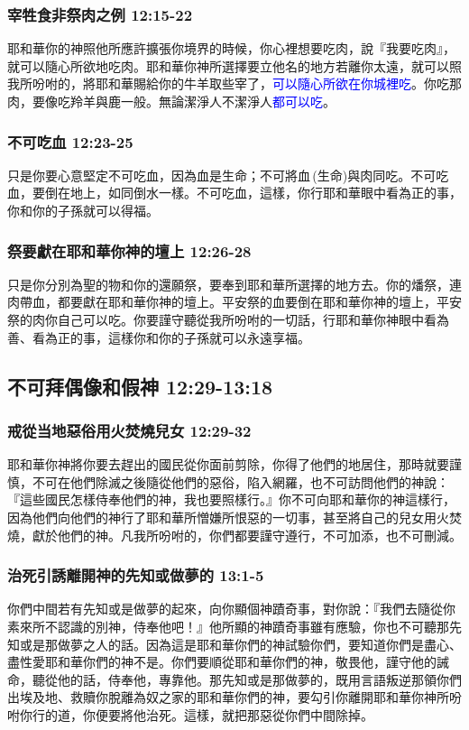 \subsubsection{宰牲食非祭肉之例 12:15-22}
耶和華你的神照他所應許擴張你境界的時候，你心裡想要吃肉，說『我要吃肉』，就可以隨心所欲地吃肉。耶和華你神所選擇要立他名的地方若離你太遠，就可以照我所吩咐的，將耶和華賜給你的牛羊取些宰了，\textcolor{blue}{可以隨心所欲在你城裡吃}。你吃那肉，要像吃羚羊與鹿一般。無論潔淨人不潔淨人\textcolor{blue}{都可以吃}。

\subsubsection{不可吃血 12:23-25}
只是你要心意堅定不可吃血，因為血是生命；不可將血 (生命)與肉同吃。不可吃血，要倒在地上，如同倒水一樣。不可吃血，這樣，你行耶和華眼中看為正的事，你和你的子孫就可以得福。

\subsubsection{祭要獻在耶和華你神的壇上 12:26-28}
只是你分別為聖的物和你的還願祭，要奉到耶和華所選擇的地方去。你的燔祭，連肉帶血，都要獻在耶和華你神的壇上。平安祭的血要倒在耶和華你神的壇上，平安祭的肉你自己可以吃。你要謹守聽從我所吩咐的一切話，行耶和華你神眼中看為善、看為正的事，這樣你和你的子孫就可以永遠享福。

\subsection{不可拜偶像和假神 12:29-13:18 }
\subsubsection{戒從当地惡俗用火焚燒兒女 12:29-32}
耶和華你神將你要去趕出的國民從你面前剪除，你得了他們的地居住，那時就要謹慎，不可在他們除滅之後隨從他們的惡俗，陷入網羅，也不可訪問他們的神說：『這些國民怎樣侍奉他們的神，我也要照樣行。』你不可向耶和華你的神這樣行，因為他們向他們的神行了耶和華所憎嫌所恨惡的一切事，甚至將自己的兒女用火焚燒，獻於他們的神。凡我所吩咐的，你們都要謹守遵行，不可加添，也不可刪減。

\subsubsection{治死引誘離開神的先知或做夢的 13:1-5}
你們中間若有先知或是做夢的起來，向你顯個神蹟奇事，對你說：『我們去隨從你素來所不認識的別神，侍奉他吧！』他所顯的神蹟奇事雖有應驗，你也不可聽那先知或是那做夢之人的話。因為這是耶和華你們的神試驗你們，要知道你們是盡心、盡性愛耶和華你們的神不是。你們要順從耶和華你們的神，敬畏他，謹守他的誡命，聽從他的話，侍奉他，專靠他。那先知或是那做夢的，既用言語叛逆那領你們出埃及地、救贖你脫離為奴之家的耶和華你們的神，要勾引你離開耶和華你神所吩咐你行的道，你便要將他治死。這樣，就把那惡從你們中間除掉。

